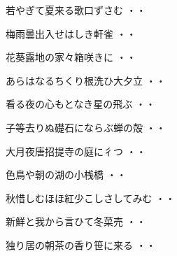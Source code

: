 \vspace{0.6cm}
\begin{shiika}若やぎて夏来る歌口ずさむ
\hfill{・・}\end{shiika}
\vspace{0.6cm}
\begin{shiika}梅雨曇出入せはしき軒雀
\hfill{・・}\end{shiika}
\vspace{0.6cm}
\begin{shiika}花葵露地の家々箱咲きに
\hfill{・・}\end{shiika}
\vspace{0.6cm}
\begin{shiika}あらはなるちくり根洗ひ大夕立
\hfill{・・}\end{shiika}
\vspace{0.6cm}
\begin{shiika}看る夜の心もとなき星の飛ぶ
\hfill{・・}\end{shiika}
\vspace{0.6cm}
\begin{shiika}子等去りぬ礎石にならぶ蝉の殻
\hfill{・・}\end{shiika}
\vspace{0.6cm}
\begin{shiika}大月夜唐招提寺の庭に彳つ
\hfill{・・}\end{shiika}
\vspace{0.6cm}
\begin{shiika}色鳥や朝の湖の小桟橋
\hfill{・・}\end{shiika}
\vspace{0.6cm}
\begin{shiika}秋惜しむほほ紅少こしさしてみむ
\hfill{・・}\end{shiika}
\vspace{0.6cm}
\begin{shiika}新鮮と我から言ひて冬菜売
\hfill{・・}\end{shiika}
\vspace{0.6cm}
\begin{shiika}独り居の朝茶の香り笹に来る
\hfill{・・}\end{shiika}
